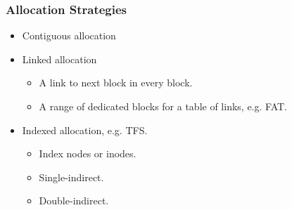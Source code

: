 \begin{frame}

\frametitle{Allocation Strategies}

\begin{itemize}

\item Contiguous allocation

\item Linked allocation

\begin{itemize}

\item A link to next block in every block.

\item A range of dedicated blocks for a table of links, e.g. FAT.

\end{itemize}

\item Indexed allocation, e.g. TFS.

\begin{itemize}

\item Index nodes or inodes.

\item Single-indirect.

\item Double-indirect.

\end{itemize}

\end{itemize}

\end{frame}
